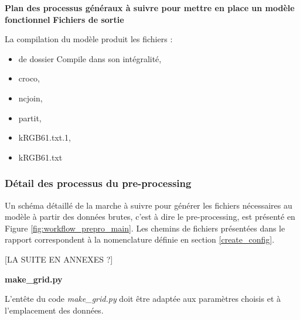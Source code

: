 \documentclass[10pt,a4paper,titlepage]{article}
\begin{document}
\begin{processEnv}{\textbf{Plan des processus généraux à suivre pour mettre en place un modèle fonctionnel}}
        {\color{outputColor}\textbf{Fichiers de sortie}}
        
        La compilation du modèle produit les fichiers :
        
        \begin{itemize}
            \item de dossier Compile dans son intégralité,
            \item croco,
            \item ncjoin,
            \item partit,
            \item kRGB61.txt.1,
            \item kRGB61.txt
        \end{itemize}
        
    \end{processEnv}

    
    \subsubsection{Détail des processus du pre-processing}
    Un schéma détaillé de la marche à suivre pour générer les fichiers nécessaires au modèle à partir des données brutes, c'est à dire le pre-processing, est présenté en Figure \ref{fig:workflow_prepro_main}.
    Les chemins de fichiers présentées dans le rapport correspondent à la nomenclature définie en section \ref{create_config}.
    
    
    [LA SUITE EN ANNEXES ?]
    
    \textbf{make\_grid.py}
    
    L'entête du code \textit{make\_grid.py} doit être adaptée aux paramètres choisis et à l'emplacement des données.
    
\end{document}
